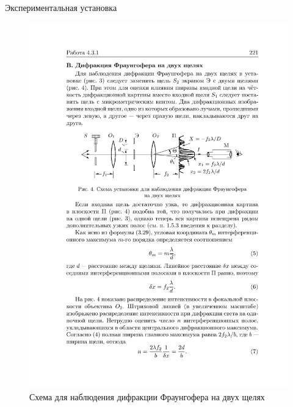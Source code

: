 \documentclass[11pt]{beamer} %
\begin{document}
     \begin{frame}{Экспериментальная установка}
      \begin{figure}[H]
          \centering
          \includegraphics[width = \textwidth]{images/c.pdf}
          \caption{Схема для наблюдения дифракции Фраунгофера на двух щелях}
          \label{fig:inst_c}
      \end{figure}
    \end{frame}
   
\end{document}

